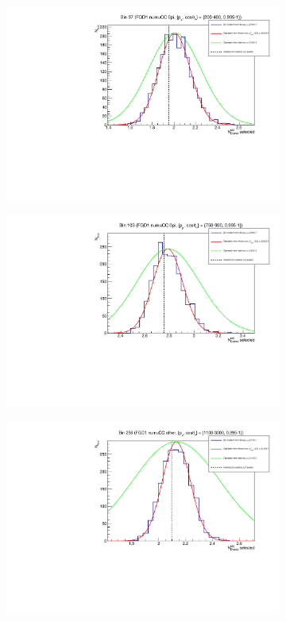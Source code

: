 \begin{figure}[h]
\centering
\begin{subfigure}{.49\textwidth}
  \centering
  \includegraphics[width=0.95\linewidth]{figs/detbin_nopisi97}
\end{subfigure}
\begin{subfigure}{.49\textwidth}
  \centering
  \includegraphics[width=0.95\linewidth]{figs/detbin_nopisi103}
\end{subfigure}
\begin{subfigure}{.49\textwidth}
  \centering
  \includegraphics[width=0.95\linewidth]{figs/detbin_nopisi258}

\end{subfigure}
\end{figure}
